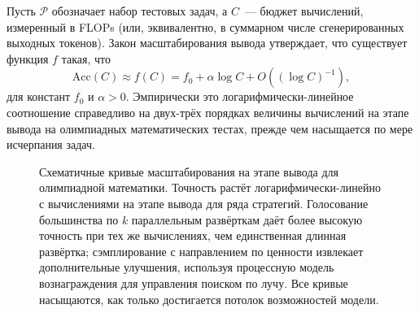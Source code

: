 Пусть $\mathcal{P}$ обозначает набор тестовых задач, а
$C$~--- бюджет вычислений, измеренный в FLOPs (или, эквивалентно, в
суммарном числе сгенерированных выходных токенов). Закон масштабирования вывода утверждает, что
существует функция $f$ такая, что
\begin{equation}
\label{eq:inference-scaling}
\text{Acc}(C) \approx f(C) = f_0 + \alpha \log C + O((\log C)^{-1}),
\end{equation}
для констант $f_0$ и $\alpha > 0$. Эмпирически это логарифмически-линейное
соотношение справедливо на двух-трёх порядках величины вычислений на этапе вывода
на олимпиадных математических тестах, прежде чем насыщается по мере исчерпания задач.

\begin{figure}[ht]
\centering
{}
\caption{Схематичные кривые масштабирования на этапе вывода для олимпиадной
  математики. Точность растёт логарифмически-линейно с вычислениями на этапе вывода для
  ряда стратегий. Голосование большинства по $k$ параллельным развёрткам
  даёт более высокую точность при тех же вычислениях, чем единственная длинная
  развёртка; сэмплирование с направлением по ценности извлекает дополнительные улучшения, используя
  процессную модель вознаграждения для управления поиском по лучу. Все кривые насыщаются,
  как только достигается потолок возможностей модели.}
\label{fig:inference-scaling}
\end{figure}

